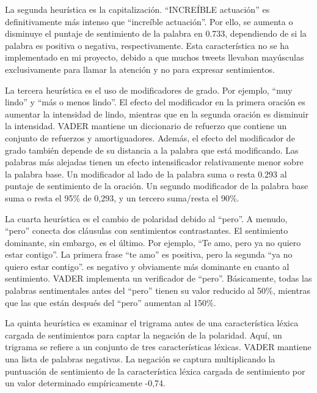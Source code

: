\vspace{0.3cm}

La segunda heurística es la capitalización. \enquote{INCREÍBLE actuación} es definitivamente más intenso que \enquote{increíble actuación}. Por ello, se aumenta o disminuye el puntaje de sentimiento de la palabra en 0.733, dependiendo de si la palabra es positiva o negativa, respectivamente. Esta característica no se ha implementado en mi proyecto, debido a que muchos tweets llevaban mayúsculas exclusivamente para llamar la atención y no para expresar sentimientos.

\vspace{0.3cm}

La tercera heurística es el uso de modificadores de grado. Por ejemplo, \enquote{muy lindo} y \enquote{más o menos lindo}. El efecto del modificador en la primera oración es aumentar la intensidad de lindo, mientras que en la segunda oración es disminuir la intensidad. \ac{VADER} mantiene un diccionario de refuerzo que contiene un conjunto de refuerzos y amortiguadores. Además, el efecto del modificador de grado también depende de su distancia a la palabra que está modificando. Las palabras más alejadas tienen un efecto intensificador relativamente menor sobre la palabra base. Un modificador al lado de la palabra suma o resta 0.293 al puntaje de sentimiento de la oración. Un segundo modificador de la palabra base suma o resta el 95\% de 0,293, y un tercero suma/resta el 90\%.

\vspace{0.3cm}

La cuarta heurística es el cambio de polaridad debido al \enquote{pero}. A menudo, \enquote{pero} conecta dos cláusulas con sentimientos contrastantes. El sentimiento dominante, sin embargo, es el último. Por ejemplo, \enquote{Te amo, pero ya no quiero estar contigo}. La primera frase \enquote{te amo} es positiva, pero la segunda \enquote{ya no quiero estar contigo}. es negativo y obviamente más dominante en cuanto al sentimiento. \ac{VADER} implementa un verificador de \enquote{pero}. Básicamente, todas las palabras sentimentales antes del \enquote{pero} tienen su valor reducido al 50\%, mientras que las que están después del \enquote{pero} aumentan al 150\%.

\vspace{0.3cm}

La quinta heurística es examinar el trigrama antes de una característica léxica cargada de sentimientos para captar la negación de la polaridad. Aquí, un trigrama se refiere a un conjunto de tres características léxicas. \ac{VADER} mantiene una lista de palabras negativas. La negación se captura multiplicando la puntuación de sentimiento de la característica léxica cargada de sentimiento por un valor determinado empíricamente -0,74.

